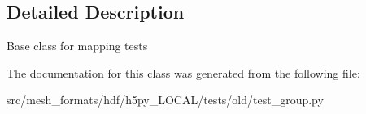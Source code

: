 \subsection{Detailed Description}
\begin{DoxyVerb}    Base class for mapping tests
\end{DoxyVerb}
 

The documentation for this class was generated from the following file\+:\begin{DoxyCompactItemize}
\item 
src/mesh\+\_\+formats/hdf/h5py\+\_\+\+L\+O\+C\+A\+L/tests/old/test\+\_\+group.\+py\end{DoxyCompactItemize}
